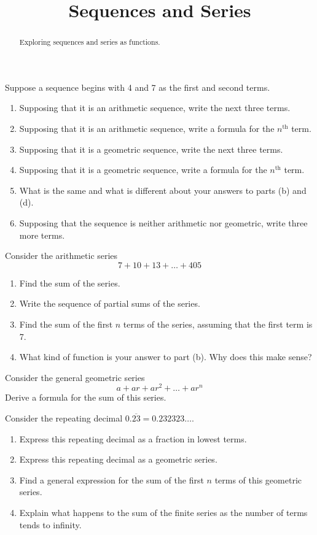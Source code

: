 \documentclass[space,handout,nooutcomes]{ximera}
\title{Sequences and Series}
\begin{document}
\begin{abstract}
Exploring sequences and series as functions.    
\end{abstract}
\maketitle


\begin{problem}
Suppose a sequence begins with 4 and 7 as the first and second terms. 
\begin{enumerate}
\item Supposing that it is an arithmetic sequence, write the next three terms. 
\item Supposing that it is an arithmetic sequence, write a formula for the $n^\textrm{th}$ term.  
\item Supposing that it is a geometric sequence, write the next three terms. 
\item Supposing that it is a geometric sequence, write a formula for the $n^\textrm{th}$ term.
\item What is the same and what is different about your answers to parts (b) and (d).     
\item Supposing that the sequence is neither arithmetic nor geometric, write three more terms.  
\end{enumerate}
\end{problem}

\begin{problem}
Consider the arithmetic series
\[
7 + 10 + 13 + \dots + 405
\]
\begin{enumerate}
\item Find the sum of the series.  
\item Write the sequence of partial sums of the series.  
\item Find the sum of the first $n$ terms of the series, assuming that the first term is 7. 
\item What kind of function is your answer to part (b).  Why does this make sense? 
\end{enumerate}
\end{problem}


\begin{problem}
Consider the general geometric series
\[
a + ar + ar^2 + \dots + ar^n
\]
Derive a formula for the sum of this series.  
\end{problem}

\begin{problem}
Consider the repeating decimal $0.\overline{23} = 0.232323\dots$.  
\begin{enumerate}
\item Express this repeating decimal as a fraction in lowest terms. 
\item Express this repeating decimal as a geometric series. 
\item Find a general expression for the sum of the first $n$ terms of this geometric series. 
\item Explain what happens to the sum of the finite series as the number of terms tends to infinity.   
\end{enumerate}
\end{problem}
\end{document}
